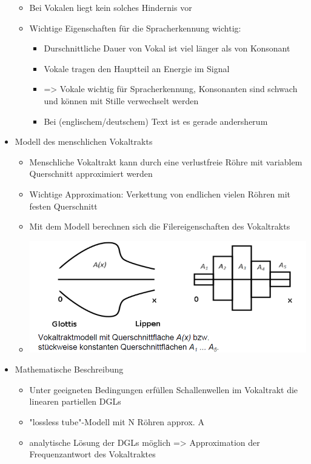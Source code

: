 \documentclass[a4paper,10pt,oneside]{article}
\begin{document}
\begin{itemize}
\begin{itemize}
				\item Bei Vokalen liegt kein solches Hindernis vor
				\item Wichtige Eigenschaften für die Spracherkennung wichtig:
					\begin{itemize}
						\item Durschnittliche Dauer von Vokal ist viel länger als von Konsonant
						\item Vokale tragen den Hauptteil an Energie im Signal
						\item => Vokale wichtig für Spracherkennung, Konsonanten sind schwach und können mit Stille verwechselt werden
						\item Bei (englischem/deutschem) Text ist es gerade andersherum
					\end{itemize}
			\end{itemize}
		\item Modell des menschlichen Vokaltrakts
			\begin{itemize}
				\item Menschliche Vokaltrakt kann durch eine verlustfreie Röhre mit variablem Querschnitt approximiert werden
				\item Wichtige Approximation: Verkettung von endlichen vielen Röhren mit festen Querschnitt
				\item Mit dem Modell berechnen sich die Filereigenschaften des Vokaltrakts
				\item [] \includegraphics[scale=0.2]{Grafiken/1218.png}\\
			\end{itemize}
		\item Mathematische Beschreibung
			\begin{itemize}
				\item Unter geeigneten Bedingungen erfüllen Schallenwellen im Vokaltrakt die linearen partiellen DGLs
				\item "lossless tube"-Modell mit N Röhren approx. A
				\item analytische Lösung der DGLs möglich => Approximation der Frequenzantwort des Vokaltraktes

\end{itemize}
\end{itemize}
\end{document}
